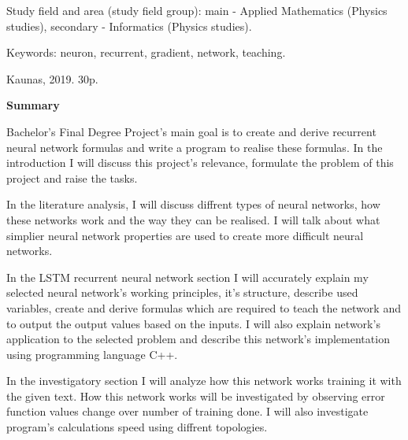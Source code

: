 Study field and area (study field group): main - Applied Mathematics (Physics studies), secondary - Informatics (Physics studies).

Keywords: neuron, recurrent, gradient, network, teaching.

Kaunas, 2019. 30p.

\begin{center}
\textbf{Summary}
\end{center}

Bachelor's Final Degree Project's main goal is to create and derive recurrent neural network formulas and write a program to realise these formulas. In the introduction I will discuss this project's relevance, formulate the problem of this project and raise the tasks.

In the literature analysis, I will discuss diffrent types of neural networks, how these networks work and the way they can be realised. I will talk about what simplier neural network properties are used to create more difficult neural networks.

In the LSTM recurrent neural network section I will accurately explain my selected neural network's working principles, it's structure, describe used variables, create and derive formulas which are required to teach the network and to output the output values based on the inputs. I will also explain network's application to the selected problem and describe this network's implementation using programming language C++.

In the investigatory section I will analyze how this network works training it with the given text. How this network works will be investigated by observing error function values change over number of training done. I will also investigate program's calculations speed using diffrent topologies.

